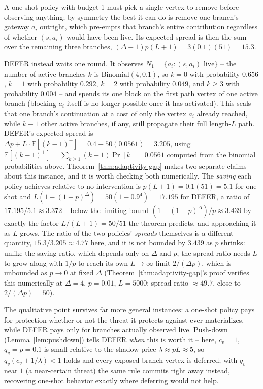 \documentclass[ijoc,sglanonrev]{informs4}
\begin{document}
A one-shot policy with budget 1 must pick a single vertex to remove before
observing anything; by symmetry the best it can do is remove one branch's
gateway $a_i$ outright, which pre-empts that branch's entire contribution
regardless of whether $(s,a_i)$ would have been live. Its expected spread
is then the sum over the remaining three branches,
$(\Delta-1)p(L+1)=3(0.1)(51)=15.3$.

DEFER instead waits one round. It observes $N_1=\{a_i:(s,a_i)\text{ live}\}$
-- the number of active branches $k$ is $\mathrm{Binomial}(4,0.1)$, so
$k=0$ with probability $0.656$, $k=1$ with probability $0.292$, $k=2$ with
probability $0.049$, and $k\ge3$ with probability $0.004$ -- and spends its
one block on the first path vertex of one active branch (blocking $a_i$
itself is no longer possible once it has activated). This seals that one
branch's continuation at a cost of only the vertex $a_i$ already reached,
while $k-1$ other active branches, if any, still propagate their full
length-$L$ path. DEFER's expected spread is
$\Delta p+L\cdot\mathbb E[(k-1)^+]=0.4+50(0.0561)=3.205$, using
$\mathbb E[(k-1)^+]=\sum_{k\ge1}(k-1)\Pr[k]=0.0561$ computed from the
binomial probabilities above. Theorem~\ref{thm:adaptivity-gap} makes two
separate claims about this instance, and it is worth checking both
numerically. The \emph{saving} each policy achieves relative to no
intervention is $p(L+1)=0.1(51)=5.1$ for one-shot and
$L(1-(1-p)^\Delta)=50(1-0.9^4)=17.195$ for DEFER, a ratio of
$17.195/5.1\approx3.372$ -- below the limiting bound
$(1-(1-p)^\Delta)/p\approx3.439$ by exactly the factor $L/(L+1)=50/51$ the
theorem predicts, and approaching it as $L$ grows. The ratio of the two
policies' \emph{spreads} themselves is a different quantity,
$15.3/3.205\approx4.77$ here, and it is not bounded by $3.439$ as $p$
shrinks: unlike the saving ratio, which depends only on $\Delta$ and $p$,
the spread ratio needs $L$ to grow along with $1/p$ to reach its own
$L\to\infty$ limit $2/(\Delta p)$, which is unbounded as $p\to0$ at fixed
$\Delta$ (Theorem~\ref{thm:adaptivity-gap}'s proof verifies this
numerically at $\Delta=4$, $p=0.01$, $L=5000$: spread ratio $\approx49.7$,
close to $2/(\Delta p)=50$).

The qualitative point survives far more general instances: a one-shot
policy pays for protection whether or not the threat it protects against
ever materializes, while DEFER pays only for branches actually observed
live. Push-down (Lemma~\ref{lem:pushdown}) tells DEFER \emph{when} this is
worth it -- here, $c_v=1$, $q_v=p=0.1$ is small relative to the shadow
price $\lambda\approx pL\approx5$, so $q_v(c_v+1/\lambda)<1$ holds and
every exposed branch vertex is deferred; with $q_v$ near $1$ (a
near-certain threat) the same rule commits right away instead, recovering
one-shot behavior exactly where deferring would not help.
\end{document}
